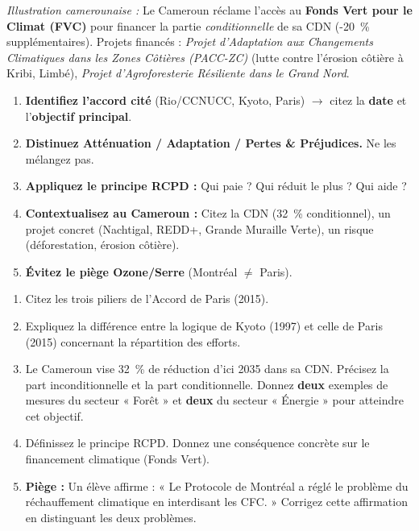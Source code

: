 \documentclass[11pt]{article}
\begin{document}
\emph{Illustration camerounaise :} Le Cameroun réclame l'accès au \textbf{Fonds Vert pour le Climat (FVC)} pour financer la partie \emph{conditionnelle} de sa CDN (-\SI{20}{\%} supplémentaires). Projets financés : \emph{Projet d'Adaptation aux Changements Climatiques dans les Zones Côtières (PACC-ZC)} (lutte contre l'érosion côtière à Kribi, Limbé), \emph{Projet d'Agroforesterie Résiliente dans le Grand Nord}.

\begin{methode}
\begin{enumerate}
    \item \textbf{Identifiez l'accord cité} (Rio/CCNUCC, Kyoto, Paris) $\rightarrow$ citez la \textbf{date} et l'\textbf{objectif principal}.
    \item \textbf{Distinuez Atténuation / Adaptation / Pertes \& Préjudices.} Ne les mélangez pas.
    \item \textbf{Appliquez le principe RCPD :} Qui paie ? Qui réduit le plus ? Qui aide ?
    \item \textbf{Contextualisez au Cameroun :} Citez la CDN (\SI{32}{\%} conditionnel), un projet concret (Nachtigal, REDD+, Grande Muraille Verte), un risque (déforestation, érosion côtière).
    \item \textbf{Évitez le piège Ozone/Serre} (Montréal $\neq$ Paris).
\end{enumerate}
\end{methode}

\begin{exercice}
\begin{enumerate}
    \item Citez les trois piliers de l'Accord de Paris (2015).
    \item Expliquez la différence entre la logique de Kyoto (1997) et celle de Paris (2015) concernant la répartition des efforts.
    \item Le Cameroun vise \SI{32}{\%} de réduction d'ici 2035 dans sa CDN. Précisez la part inconditionnelle et la part conditionnelle. Donnez \textbf{deux} exemples de mesures du secteur « Forêt » et \textbf{deux} du secteur « Énergie » pour atteindre cet objectif.
    \item Définissez le principe RCPD. Donnez une conséquence concrète sur le financement climatique (Fonds Vert).
    \item \textbf{Piège :} Un élève affirme : « Le Protocole de Montréal a réglé le problème du réchauffement climatique en interdisant les CFC. » Corrigez cette affirmation en distinguant les deux problèmes.
\end{enumerate}
\end{exercice}
\end{document}

